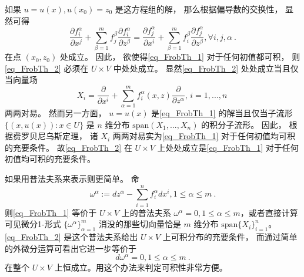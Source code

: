 如果 $u=u(x),u(x_0)=z_0$ 是这方程组的解， 那么根据偏导数的交换性， 显然可得
\begin{equation}\label{eq_FrobTh_2}
\frac{\partial f_i^\alpha}{\partial x^j}+\sum_{\beta=1}^mf_j^\beta\frac{\partial f_i^\alpha}{\partial z^\beta}
=\frac{\partial f_j^\alpha}{\partial x^i}+\sum_{\beta=1}^mf_i^\beta\frac{\partial f_j^\alpha}{\partial z^\beta},\forall i,j,\alpha~.
\end{equation}
在点 $(x_0,z_0)$ 处成立。 因此， 欲使得\autoref{eq_FrobTh_1} 对于任何初值都可积， 则\autoref{eq_FrobTh_2} 必须在 $U\times V$ 中处处成立。 显然\autoref{eq_FrobTh_2} 处处成立当且仅当向量场
$$
X_i=\frac{\partial}{\partial x^i}+\sum_{\alpha=1}^mf_i^\alpha(x,z)\frac{\partial}{\partial z^\alpha},\,i=1,...,n~
$$
两两对易。 然而另一方面， $u=u(x)$ 是\autoref{eq_FrobTh_1} 的解当且仅当子流形 $\{(x,u(x)):x\in U\}$ 是 $n$ 维分布 $\text{span}(X_1,...,X_n)$ 的积分子流形。 因此， 根据费罗贝尼乌斯定理， 诸 $X_i$ 两两对易实为\autoref{eq_FrobTh_1} 对于任何初值均可积的充要条件。 故\autoref{eq_FrobTh_2} 在 $U\times V$ 上处处成立是\autoref{eq_FrobTh_1} 对于任何初值均可积的充要条件。

如果用普法夫系来表示则更简单。 命
\begin{equation}\label{eq_FrobTh_3}
\omega^\alpha:=dz^\alpha-\sum_{i=1}^nf_i^\alpha dx^i,1\leq\alpha\leq m~.
\end{equation}
则\autoref{eq_FrobTh_1} 等价于 $U\times V$ 上的普法夫系 $\omega^\alpha=0,1\leq\alpha\leq m$，或者直接计算可见微分1-形式 $\{\omega^\alpha\}_{\alpha=1}^m$ 消没的那些切向量恰是 $m$ 维分布 $\text{span}\{X_i\}_{i=1}^n$。 \autoref{eq_FrobTh_2} 是这个普法夫系给出 $U\times V$ 上可积分布的充要条件， 而通过简单的外微分运算可看出它进一步等价于
$$
d\omega^\alpha=0,1\leq\alpha\leq m~.
$$
在整个 $U\times V$ 上恒成立。用这个办法来判定可积性非常方便。

